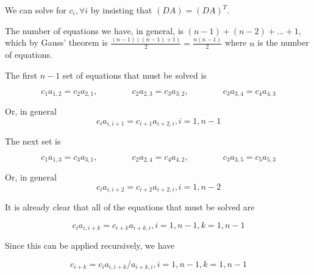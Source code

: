 \documentclass[landscape]{article}
\begin{document}
We can solve for $c_i,\forall i$ by insisting that $(DA) = (DA)^T$. 

The number of equations we have, in general, is $(n-1)+(n-2)+ \dots + 1$, which by Gauss' theorem is $\frac{(n-1)((n-1)+1)}{2} = \frac{n(n-1)}{2}$ where $n$ is the number of equations.

The first $n-1$ set of equations that must be solved is

\begin{equation}
  c_1 a_{1,2} = c_2 a_{2,1}, \qquad \qquad
  c_2 a_{2,3} = c_3 a_{3,2}, \qquad \qquad
  c_3 a_{3,4} = c_4 a_{4,3}
\end{equation}

Or, in general
\begin{equation}
  c_i a_{i,i+1} = c_{i+1} a_{i+2,i}, i=1,n-1
\end{equation}

The next set is

\begin{equation}
  c_1 a_{1,3} = c_3 a_{3,1}, \qquad \qquad
  c_2 a_{2,4} = c_4 a_{4,2}, \qquad \qquad
  c_3 a_{3,5} = c_5 a_{5,3}
\end{equation}

Or, in general
\begin{equation}
  c_i a_{i,i+2} = c_{i+2} a_{i+2,i}, i=1,n-2
\end{equation}

It is already clear that all of the equations that must be solved are

\begin{equation}
  c_i a_{i,i+k} = c_{i+k} a_{i+k,i}, i=1,n-1, k=1,n-1
\end{equation}

Since this can be applied recursively, we have

\begin{equation}
  c_{i+k} = c_i a_{i,i+k}/a_{i+k,i}, i=1,n-1, k=1,n-1
\end{equation}
\end{document}
